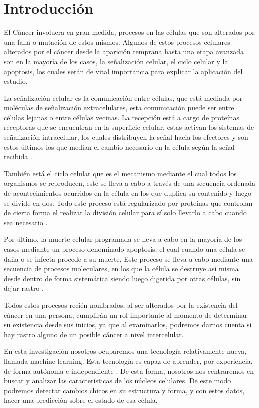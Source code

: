 \documentclass[12pt, letterpaper]{article}
\begin{document}
\newpage

\tableofcontents

\newpage

\section{Introducción}

El Cáncer involucra en gran medida, procesos en las células que son alterados por una falla o mutación de estos mismos. Algunos de estos procesos celulares alterados por el cáncer desde la aparición temprana hasta una etapa avanzada son en la mayoría de los casos, la señalización celular, el ciclo celular y la apoptosis, los cuales serán de vital importancia para explicar la aplicación del estudio.

La señalización celular es la comunicación entre células, que está mediada por moléculas de señalización extracelulares, esta comunicación puede ser entre células lejanas o entre células vecinas. La recepción está a cargo de proteínas receptoras que se encuentran en la superficie celular, estas activan los sistemas de señalización intracelular, los cuales distribuyen la señal hacia los efectores y son estos últimos los que median el cambio necesario en la célula según la señal recibida \autocite[p.~879]{albertsBiologiaMolecularCelula2010}.

También está el ciclo celular que es el mecanismo mediante el cual todos los organismos se reproducen, este se lleva a cabo a través de una secuencia ordenada de acontecimientos ocurridos en la célula en los que duplica su contenido y luego se divide en dos. Todo este proceso está regularizado por proteínas que controlan de cierta forma el realizar la división celular para sí solo llevarlo a cabo cuando sea necesario \autocite[p.~1053]{albertsBiologiaMolecularCelula2010}.

Por último, la muerte celular programada se lleva a cabo en la mayoría de los casos mediante un proceso denominado apoptosis, el cual cuando una célula se daña o se infecta procede a su muerte. Este proceso se lleva a cabo mediante una secuencia de procesos moleculares, en los que la célula se destruye así misma desde dentro de forma sistemática siendo luego digerida por otras células, sin dejar rastro \autocite[p.~1115]{albertsBiologiaMolecularCelula2010}.

Todos estos procesos recién nombrados, al ser alterados por la existencia del cáncer en una persona, cumplirán un rol importante al momento de determinar su existencia desde sus inicios, ya que al examinarlos, podremos darnos cuenta si hay rastro alguno de un posible cáncer a nivel intercelular.

En esta investigación nosotros ocuparemos una tecnología relativamente nueva, llamada machine learning. Esta tecnología es capaz de aprender, por experiencia, de forma autónoma e independiente \autocite{MachineLearningCambridge}. De esta forma, nosotros nos centraremos en buscar y analizar las características de los núcleos celulares. De este modo podremos detectar cambios chicos en su estructura y forma, y con estos datos, hacer una predicción sobre el estado de esa célula.

\printbibliography
\end{document}
